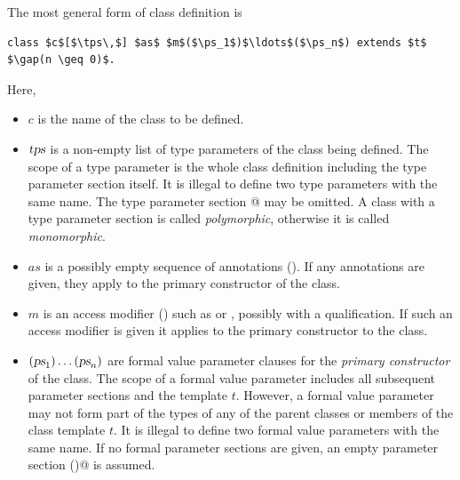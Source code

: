 The most general form of class definition is 
\begin{lstlisting}
class $c$[$\tps\,$] $as$ $m$($\ps_1$)$\ldots$($\ps_n$) extends $t$    $\gap(n \geq 0)$.
\end{lstlisting}
Here,
\begin{itemize}
\item[]
$c$ is the name of the class to be defined.
\item[] $\mbox{\sl tps}$ is a non-empty list of type parameters of the class
being defined.  The scope of a type parameter is the whole class
definition including the type parameter section itself.  It is
illegal to define two type parameters with the same name.  The type
parameter section \lstinline@[$\tps\,$]@ may be omitted. A class with a type
parameter section is called {\em polymorphic}, otherwise it is called
{\em monomorphic}.
\item[] $as$ is a possibly empty sequence of annotations
  (). If any annotations are given, 
they apply to the primary constructor of the class.
\item[] $m$ is an access modifier () such as
 or , possibly with a qualification.  If
such an access modifier is given it applies to the primary constructor
to the class.
\item[] 
$(\mbox{\sl ps}_1)\ldots(\mbox{\sl ps}_n)$ are formal value parameter clauses for the {\em primary
constructor} of the class. The scope of a formal value parameter includes
all subsequent parameter sections and the template $t$. However, a formal value
parameter may not form
part of the types of any of the parent classes or members of the class
template $t$.
It is illegal to define two formal value parameters with the same name.
If no formal parameter sections are given, 
an empty parameter section \lstinline@()@ is assumed.


\end{itemize}
